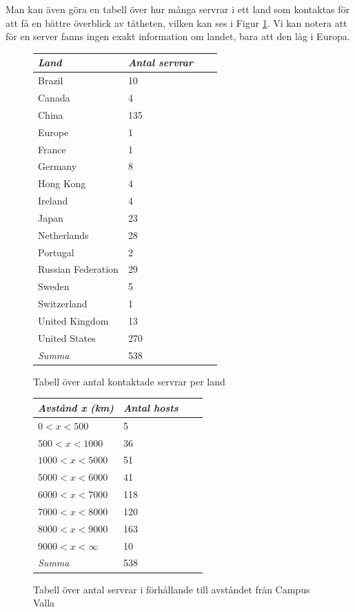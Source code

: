 \documentclass[a4paper]{article}
\begin{document}
Man kan även göra en tabell över hur många servrar i ett land som kontaktas för att få en bättre överblick av tätheten, vilken kan ses i Figur \ref{tab:countries}. Vi kan notera att för en server fanns ingen exakt information om landet, bara att den låg i Europa.

\begin{figure}
    \centering
    \begin{tabular}{ | l | l | l | p{5cm} |}
    \hline
    \emph{Land} & \emph{Antal servrar} \\ \hline
        Brazil  &   10 \\ \hline
        Canada  &   4 \\ \hline
        China   &   135 \\ \hline
        Europe  &   1 \\ \hline
        France  &   1 \\ \hline
        Germany &   8 \\ \hline
        Hong Kong   &   4 \\ \hline
        Ireland &   4 \\ \hline
        Japan   &   23 \\ \hline
        Netherlands &   28 \\ \hline
        Portugal    &   2 \\ \hline
        Russian Federation  &   29 \\ \hline
        Sweden  &   5 \\ \hline
        Switzerland &   1 \\ \hline
        United Kingdom  &   13 \\ \hline
        United States   &   270 \\ \hline
        \hline
        \emph{Summa} & 538 \\ \hline
    \end{tabular}
    \caption{Tabell över antal kontaktade servrar per land}
    \label{tab:countries}
\end{figure}


\begin{figure}
    \centering
    \begin{tabular}{ | l | l | l | p{5cm} |}
    \hline
    \emph{Avstånd x (km)} & \emph{Antal hosts} \\ \hline
        $0 < x < 500$ & 5 \\ \hline
        $500 < x < 1000$ & 36 \\ \hline
        $1000 < x < 5000$ & 51 \\ \hline
        $5000 < x < 6000$ & 41 \\ \hline
        $6000 < x < 7000$ & 118 \\ \hline
        $7000 < x < 8000$ & 120 \\ \hline
        $8000 < x < 9000$ & 163 \\ \hline
        $9000 < x < \infty$ & 10 \\ \hline
        \hline
        \emph{Summa} & 538 \\ \hline
    \end{tabular}
    \caption{Tabell över antal servrar i förhållande till avståndet från Campus Valla}
    \label{tab:distances}
\end{figure}
\end{document}
